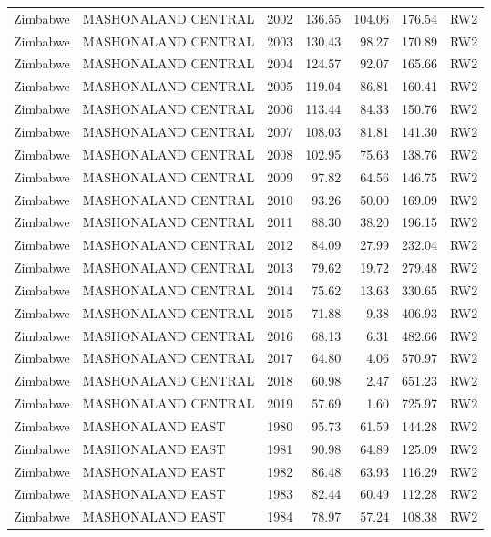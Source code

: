 \begin{longtable}{lllrrrl}
  Zimbabwe & MASHONALAND CENTRAL & 2002 & 136.55 & 104.06 & 176.54 & RW2 \\ 
  Zimbabwe & MASHONALAND CENTRAL & 2003 & 130.43 & 98.27 & 170.89 & RW2 \\ 
  Zimbabwe & MASHONALAND CENTRAL & 2004 & 124.57 & 92.07 & 165.66 & RW2 \\ 
  Zimbabwe & MASHONALAND CENTRAL & 2005 & 119.04 & 86.81 & 160.41 & RW2 \\ 
  Zimbabwe & MASHONALAND CENTRAL & 2006 & 113.44 & 84.33 & 150.76 & RW2 \\ 
  Zimbabwe & MASHONALAND CENTRAL & 2007 & 108.03 & 81.81 & 141.30 & RW2 \\ 
  Zimbabwe & MASHONALAND CENTRAL & 2008 & 102.95 & 75.63 & 138.76 & RW2 \\ 
  Zimbabwe & MASHONALAND CENTRAL & 2009 & 97.82 & 64.56 & 146.75 & RW2 \\ 
  Zimbabwe & MASHONALAND CENTRAL & 2010 & 93.26 & 50.00 & 169.09 & RW2 \\ 
  Zimbabwe & MASHONALAND CENTRAL & 2011 & 88.30 & 38.20 & 196.15 & RW2 \\ 
  Zimbabwe & MASHONALAND CENTRAL & 2012 & 84.09 & 27.99 & 232.04 & RW2 \\ 
  Zimbabwe & MASHONALAND CENTRAL & 2013 & 79.62 & 19.72 & 279.48 & RW2 \\ 
  Zimbabwe & MASHONALAND CENTRAL & 2014 & 75.62 & 13.63 & 330.65 & RW2 \\ 
  Zimbabwe & MASHONALAND CENTRAL & 2015 & 71.88 & 9.38 & 406.93 & RW2 \\ 
  Zimbabwe & MASHONALAND CENTRAL & 2016 & 68.13 & 6.31 & 482.66 & RW2 \\ 
  Zimbabwe & MASHONALAND CENTRAL & 2017 & 64.80 & 4.06 & 570.97 & RW2 \\ 
  Zimbabwe & MASHONALAND CENTRAL & 2018 & 60.98 & 2.47 & 651.23 & RW2 \\ 
  Zimbabwe & MASHONALAND CENTRAL & 2019 & 57.69 & 1.60 & 725.97 & RW2 \\ 
  Zimbabwe & MASHONALAND EAST & 1980 & 95.73 & 61.59 & 144.28 & RW2 \\ 
  Zimbabwe & MASHONALAND EAST & 1981 & 90.98 & 64.89 & 125.09 & RW2 \\ 
  Zimbabwe & MASHONALAND EAST & 1982 & 86.48 & 63.93 & 116.29 & RW2 \\ 
  Zimbabwe & MASHONALAND EAST & 1983 & 82.44 & 60.49 & 112.28 & RW2 \\ 
  Zimbabwe & MASHONALAND EAST & 1984 & 78.97 & 57.24 & 108.38 & RW2 \\ 

\end{longtable}
